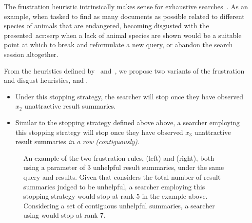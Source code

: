 The frustration heuristic intrinsically makes sense for exhaustive searches~\cite{kraft1979stopping_rules}. As an example, when tasked to find as many documents as possible related to different species of animals that are endangered, becoming disgusted with the presented~\gls{acr:serp} when a lack of animal species are shown would be a suitable point at which to break and reformulate a new query, or abandon the search session altogether.

From the heuristics defined by~\cite{cooper1973retrieval_effectiveness_ii} and~\cite{kraft1979stopping_rules}, we propose two variants of the frustration and disgust heuristics,  and .

\begin{itemize}
    \item{ Under this stopping strategy, the searcher will stop once they have observed $x_2$ unattractive result summaries.}
    
    \item{ Similar to the stopping strategy defined above above, a searcher employing this stopping strategy will stop once they have observed $x_3$ unattractive result summaries \emph{in a row (contiguously)}.}
\end{itemize}

\begin{figure}[t!]
    \centering
    \caption[Examples of frustration rules  and ]{An example of the two frustration rules,  (left) and  (right), both using a parameter of 3 unhelpful result summaries, under the same query and results. Given that  considers the total number of result summaries judged to be unhelpful, a searcher employing this stopping strategy would stop at rank 5 in the example above. Considering a set of contiguous unhelpful summaries, a searcher using  would stop at rank 7.}
    \label{fig:ss23}
\end{figure}

